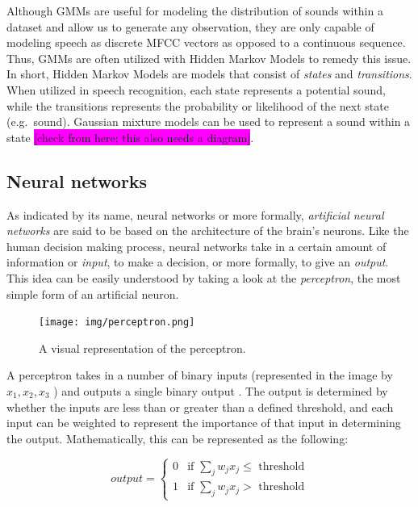 \documentclass
[
    a4paper,
    twoside,
    12pt,
]
{report}
\begin{document}
Although GMMs are useful for modeling the distribution of sounds within
a dataset and allow us to generate any observation, they are only
capable of modeling speech as discrete MFCC vectors as opposed to a
continuous sequence. Thus, GMMs are often utilized with Hidden Markov
Models to remedy this issue. In short, Hidden Markov Models are models
that consist of \emph{states} and \emph{transitions}. When utilized in
speech recognition, each state represents a potential sound, while the
transitions represents the probability or likelihood of the next state
(e.g.~sound). Gaussian mixture models can be used to represent a sound
within a state
\colorbox{magenta}{[check from here; this also needs a diagram]}.

\subsection{Neural networks}

As indicated by its name, neural networks or more formally,
\emph{artificial neural networks} are said to be based on the
architecture of the brain's neurons. Like the human decision making
process, neural networks take in a certain amount of information or
\emph{input}, to make a decision, or more formally, to give an
\emph{output}. This idea can be easily understood by taking a look at
the \emph{perceptron}, the most simple form of an artificial neuron.

\begin{figure}[ht!]
\centering
\texttt{[image: img/perceptron.png]}
\caption{A visual representation of the perceptron.}
\label{fig:perceptron}
\end{figure}

A perceptron takes in a number of binary inputs (represented in the
image by \begin{math} x_1, x_2, x_3 \end{math} ) and outputs a single
binary output \parencite{nielsen2015}. The output is determined by
whether the inputs are less than or greater than a defined threshold,
and each input can be weighted to represent the importance of that input
in determining the output. Mathematically, this can be represented as
the following:

\begin{equation*}
    output=\begin{cases}
        0 & \text{if $\sum_{j} w_jx_j \leq$ threshold} \\
        1 & \text{if $\sum_{j} w_jx_j >$ threshold}
    \end{cases}
\end{equation*}
\end{document}
